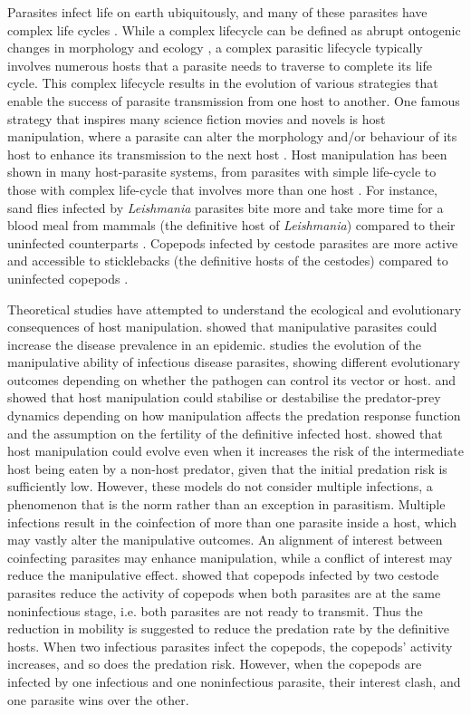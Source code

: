 \documentclass[11pt]{article}
\begin{document}
Parasites infect life on earth ubiquitously, and many of these parasites have complex life cycles \cite{zimmer:book:2001}. 
While a complex lifecycle can be defined as abrupt ontogenic changes in morphology and ecology \cite{Benesh:2016dj}, a complex parasitic lifecycle typically involves numerous hosts that a parasite needs to traverse to complete its life cycle. 
This complex lifecycle results in the evolution of various strategies that enable the success of parasite transmission from one host to another. 
One famous strategy that inspires many science fiction movies and novels is host manipulation, where a parasite can alter the morphology and/or behaviour of its  host to enhance its transmission to the next host \cite{Hughes2012}. 
Host manipulation has been shown in many host-parasite systems, from parasites with simple life-cycle to those with complex life-cycle that involves more than one host \cite{Hughes2012, molyneux1986}. 
For instance, sand flies infected by \textit{Leishmania} parasites bite more and take more time for a blood meal from mammals (the definitive host of \textit{Leishmania}) compared to their uninfected counterparts \cite{ Rogers2007}. 
Copepods infected by cestode parasites are more active and accessible to sticklebacks (the definitive hosts of the cestodes) compared to uninfected copepods \cite{Wedekind1996}.


Theoretical studies have attempted to understand the ecological and evolutionary consequences of host manipulation. \cite{Roosien2013, Hosack2008} showed that manipulative parasites could increase the disease prevalence in an epidemic. \cite{Gandon2018} studies the evolution of the manipulative ability of infectious disease parasites, showing different evolutionary outcomes depending on whether the pathogen can control its vector or host.
\cite{Hadeler1989, Fenton2006} and \cite{Rogawa2018} showed that host manipulation could stabilise or destabilise the predator-prey dynamics depending on how manipulation affects the predation response function and the assumption on the fertility of the definitive infected host. \cite{Seppl2008} showed that host manipulation could evolve even when it increases the risk of the intermediate host being eaten by a non-host predator, given that the initial predation risk is sufficiently low. 
However, these models do not consider multiple infections, a phenomenon that is the norm rather than an exception in parasitism. Multiple infections result in the coinfection of more than one parasite inside a host, which may vastly alter the manipulative outcomes. 
An alignment of interest between coinfecting parasites may enhance manipulation, while a conflict of interest may reduce the manipulative effect. 
\cite{Hafer:2015gl} showed that copepods infected by two cestode parasites reduce the activity of copepods when both parasites are at the same noninfectious stage, i.e. both parasites are not ready to transmit. Thus the reduction in mobility is suggested to reduce the predation rate by the definitive hosts. When two infectious parasites infect the copepods, the copepods' activity increases, and so does the predation risk. 
However, when the copepods are infected by one infectious and one noninfectious parasite, their interest clash, and one parasite wins over the other. 
\end{document}
